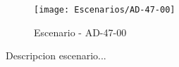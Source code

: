 \begin{figure}[H]
\centering
\texttt{[image: Escenarios/AD-47-00]}
\caption{Escenario - AD-47-00}
\label{fig:AD-47-00}
\end{figure}

Descripcion escenario...
\clearpage
